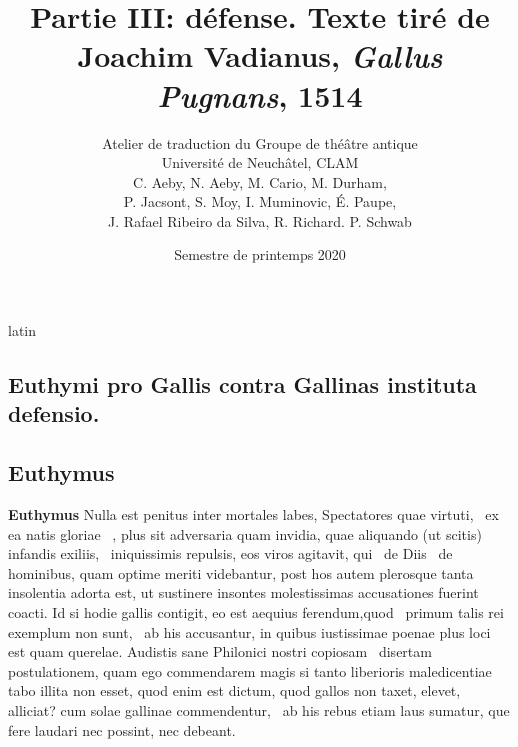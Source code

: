 \documentclass[12pt]{book}
\renewenvironment{latin}
    	{\begin{hyphenrules}{latin}}
    	{\end{hyphenrules}}
\begin{document}
        \title{Partie III: défense. Texte tiré de Joachim Vadianus, \textit{Gallus Pugnans}, 1514}
        \author{Atelier de traduction du Groupe de théâtre antique\\
            Université de Neuchâtel, CLAM\\
            C. Aeby, N. Aeby, M. Cario, M. Durham,\\ 
            P. Jacsont, S. Moy, I. Muminovic, É. Paupe,\\
            J. Rafael Ribeiro da Silva, R. Richard. P. Schwab}
        \date{Semestre de printemps 2020}
        
        \maketitle
        \begin{pages}
        \begin{latin}
        \begin{Leftside}
        \beginnumbering 
            \pstart\section*{Euthymi pro Gallis contra Gallinas instituta defensio.}\pend\pstart\subsection*{Euthymus}\pend\pstart\textbf{Euthymus}\hspace{1cm}  Nulla est penitus inter mortales labes, Spectatores quae virtuti,  \ampersand\ ex ea natis gloriae  \ampersand\ , 
                  plus sit adversaria quam invidia, quae aliquando (ut scitis) infandis exiliis,  \ampersand\ iniquissimis repulsis, eos viros agitavit, qui  \ampersand\ de Diis  \ampersand\
                  de hominibus, quam optime meriti videbantur, post hos autem plerosque tanta insolentia adorta est, ut sustinere insontes molestissimas accusationes fuerint coacti.
                  Id si hodie gallis contigit, eo est aequius ferendum,quod  \ampersand\ primum talis rei exemplum non sunt,  \ampersand\ ab his accusantur, in quibus iustissimae poenae plus loci est quam querelae.
                  Audistis sane Philonici nostri copiosam  \ampersand\ disertam postulationem, quam ego commendarem magis si tanto liberioris maledicentiae tabo illita non esset,
                  quod enim est dictum, quod gallos non taxet, elevet, alliciat? cum solae gallinae commendentur,  \ampersand\ ab his rebus etiam laus sumatur, que fere laudari nec possint, nec debeant. 

\end{Leftside}
\end{latin}
\end{pages}
\end{document}
